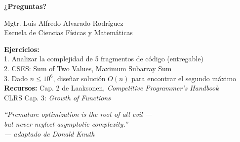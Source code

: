 \documentclass[aspectratio=169]{beamer}
\begin{document}
\begin{frame}
    \centering
    \Huge \textbf{¿Preguntas?}
    
    \vspace{0.5cm}
    \normalsize
    Mgtr. Luis Alfredo Alvarado Rodríguez\\
    \small Escuela de Ciencias Físicas y Matemáticas
    
    \vspace{0.5cm}
    \footnotesize
    \textbf{Ejercicios:}\\
    1. Analizar la complejidad de 5 fragmentos de código (entregable)\\
    2. CSES: Sum of Two Values, Maximum Subarray Sum\\
    3. Dado $n \leq 10^6$, diseñar solución $O(n)$ para encontrar el segundo máximo\\[0.3cm]
    \textbf{Recursos:} Cap. 2 de Laaksonen, \textit{Competitive Programmer's Handbook}\\
    CLRS Cap. 3: \textit{Growth of Functions}
    
    \vspace{0.3cm}
    \scriptsize
    \textit{``Premature optimization is the root of all evil ---\\but never neglect asymptotic complexity.''\\--- adaptado de Donald Knuth}
\end{frame}
\end{document}
